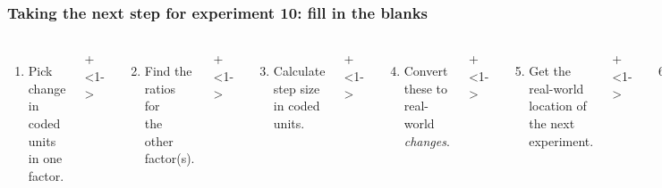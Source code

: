 \documentclass[handout,11pt,aspectratio=169,mathserif]{beamer}
\begin{document}
\begin{frame}\frametitle{Taking the next step for experiment 10: {\color{myOrange}fill in the blanks}}
	\begin{columns}[T]
		
			\vspace{0.1cm}
			{\tiny 
				\begin{enumerate}
					\item	Pick change in coded units in one factor.
				\end{enumerate}
			 \par}
			 
			\onslide+<1->{
				{\tiny 
					\begin{enumerate}\setcounter{enumi}{1}
						\item	Find the ratios for \\the other factor(s).
					\end{enumerate}
				
				\par}
			}
			
			\vspace{0.0cm}
			\onslide+<1->{
				{\tiny 
					\begin{enumerate}\setcounter{enumi}{2}
						\item	Calculate step size in coded units.
					\end{enumerate}
				
				\par}
			}
			
			\onslide+<1->{
				{\tiny 
					\begin{enumerate}\setcounter{enumi}{3}
						\item	Convert these to real-world \emph{changes}.
					\end{enumerate}
				
				\par}
			}
			
			\onslide+<1->{
				{\tiny 
					\begin{enumerate}\setcounter{enumi}{4}
						\item	Get the real-world location
						of the next experiment.
					\end{enumerate}
				
				\par}
			}
			
			
			\vspace{-0.2cm}
			\onslide+<1->{
				{\tiny 
					\begin{enumerate}\setcounter{enumi}{5}
						\item	Convert these back\\ to coded-units.
					\end{enumerate}
				
}}
\end{columns}
\end{frame}
\end{document}
